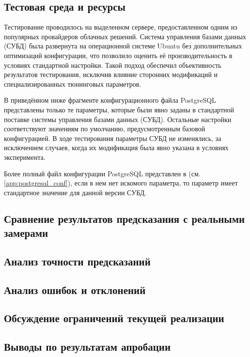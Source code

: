 \subsection{Тестовая среда и ресурсы}

Тестирование проводилось на выделенном сервере, предоставленном одним из популярных провайдеров облачных решений. 
Система управления базами данных (СУБД) была развернута на операционной системе Ubuntu без дополнительных оптимизаций конфигурации, 
что позволило оценить её производительность в условиях стандартной настройки. 
Такой подход обеспечил объективность результатов тестирования, исключив влияние сторонних модификаций и специализированных тюнинговых параметров.


В приведённом ниже фрагменте конфигурационного файла PostgreSQL представлены только те параметры, 
которые были явно заданы в стандартной поставке системы управления базами данных (СУБД). 
Остальные настройки соответствуют значениям по умолчанию, предусмотренным базовой конфигурацией. 
В ходе тестирования параметры СУБД не изменялись, за исключением случаев, когда их модификация была явно указана в условиях эксперимента.


Более полный файл конфигурации PostgreSQL представлен в (см. \ref{app:postgresql_conf}), если в нем нет искомого параметра, 
то параметр имеет стандартное значение для данной версии СУБД.

\subsection{Сравнение результатов предсказания с реальными замерами}

\subsection{Анализ точности предсказаний}

\subsection{Анализ ошибок и отклонений}

\subsection{Обсуждение ограничений текущей реализации}

\subsection{Выводы по результатам апробации}
